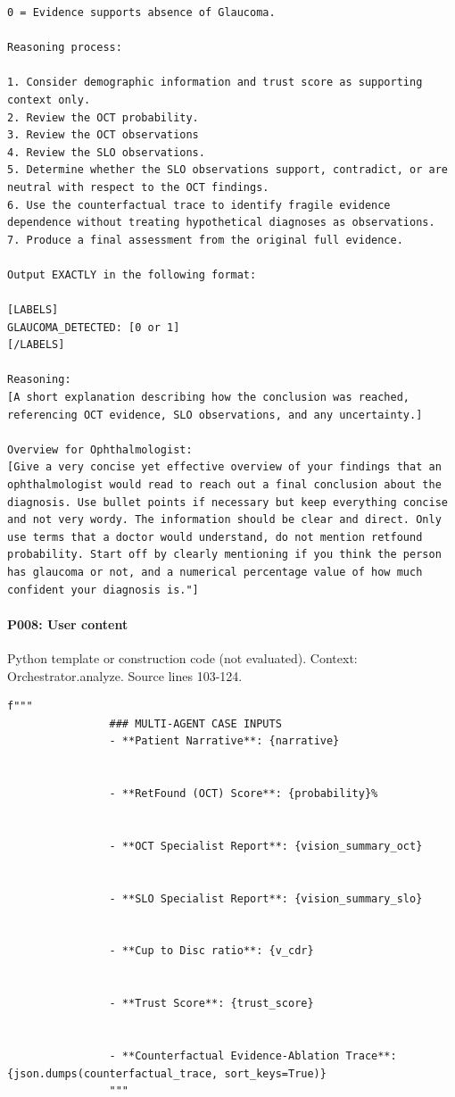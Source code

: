 \documentclass[10pt]{article}
\begin{document}
\begin{Verbatim}
0 = Evidence supports absence of Glaucoma.

Reasoning process:

1. Consider demographic information and trust score as supporting context only.
2. Review the OCT probability.
3. Review the OCT observations
4. Review the SLO observations.
5. Determine whether the SLO observations support, contradict, or are neutral with respect to the OCT findings.
6. Use the counterfactual trace to identify fragile evidence dependence without treating hypothetical diagnoses as observations.
7. Produce a final assessment from the original full evidence.

Output EXACTLY in the following format:

[LABELS]
GLAUCOMA_DETECTED: [0 or 1]
[/LABELS]

Reasoning:
[A short explanation describing how the conclusion was reached, referencing OCT evidence, SLO observations, and any uncertainty.]

Overview for Ophthalmologist:
[Give a very concise yet effective overview of your findings that an ophthalmologist would read to reach out a final conclusion about the diagnosis. Use bullet points if necessary but keep everything concise and not very wordy. The information should be clear and direct. Only use terms that a doctor would understand, do not mention retfound probability. Start off by clearly mentioning if you think the person has glaucoma or not, and a numerical percentage value of how much confident your diagnosis is."]
\end{Verbatim}
\paragraph{P008: User content}
Python template or construction code (not evaluated). Context: Orchestrator.analyze. Source lines 103-124.
\begin{Verbatim}
f"""
                ### MULTI-AGENT CASE INPUTS
                - **Patient Narrative**: {narrative}
                
                
                - **RetFound (OCT) Score**: {probability}%
                
                
                - **OCT Specialist Report**: {vision_summary_oct}
                
                
                - **SLO Specialist Report**: {vision_summary_slo}
                
                
                - **Cup to Disc ratio**: {v_cdr}
                
                
                - **Trust Score**: {trust_score}


                - **Counterfactual Evidence-Ablation Trace**: {json.dumps(counterfactual_trace, sort_keys=True)}
                """
\end{Verbatim}
\end{document}
